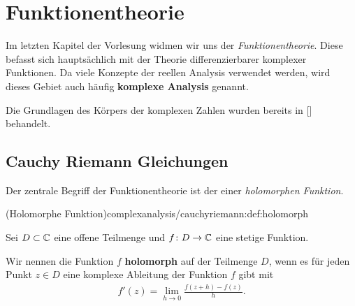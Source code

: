 \chapter{Funktionentheorie}
\label{\detokenize{complexanalysis/complexanalysis:funktionentheorie}}\label{\detokenize{complexanalysis/complexanalysis::doc}}
\par
Im letzten Kapitel der Vorlesung widmen wir uns der \emph{Funktionentheorie}.
Diese befasst sich hauptsächlich mit der Theorie differenzierbarer komplexer Funktionen.
Da viele Konzepte der reellen Analysis verwendet werden, wird dieses Gebiet auch häufig \textbf{komplexe Analysis} genannt.

\par
Die Grundlagen des Körpers der komplexen Zahlen wurden bereits in {[}{]} behandelt.


\section{Cauchy Riemann Gleichungen}
\label{\detokenize{complexanalysis/cauchyriemann:cauchy-riemann-gleichungen}}\label{\detokenize{complexanalysis/cauchyriemann::doc}}
\par
Der zentrale Begriff der Funktionentheorie ist der einer \emph{holomorphen Funktion}.
\begin{definition}{(Holomorphe Funktion)}{complexanalysis/cauchyriemann:def:holomorph}



\par
Sei \(D \subset \mathbb{C}\) eine offene Teilmenge und \(f \colon D \rightarrow \mathbb{C}\) eine stetige Funktion.

\par
Wir nennen die Funktion \(f\) \textbf{holomorph} auf der Teilmenge \(D\), wenn es für jeden Punkt \(z \in D\) eine komplexe Ableitung der Funktion \(f\) gibt mit
\begin{align*}
f'(z) = \lim_{h\rightarrow 0} \frac{f(z+h) - f(z)}{h}.
\end{align*}\end{definition}

